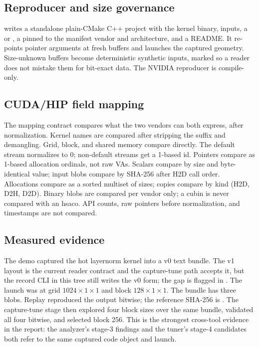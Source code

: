 \subsection{Reproducer and size governance}
\label{sec:c4-repro}

 writes a standalone plain-CMake C++ project with the kernel
binary, inputs, a  or , a 
pinned to the manifest vendor and architecture, and a README. It re-points
pointer arguments at fresh buffers and launches the captured geometry.
Size-unknown buffers become deterministic synthetic inputs, marked so a reader
does not mistake them for bit-exact data. The NVIDIA reproducer is
compile-only.

\subsection{CUDA/HIP field mapping}
\label{sec:c4-mapping}

The mapping contract compares what the two vendors can both express, after
normalization. Kernel names are compared after stripping the  suffix
and demangling. Grid, block, and shared memory compare directly. The default
stream normalizes to 0; non-default streams get a 1-based id. Pointers compare
as 1-based allocation ordinals, not raw VAs. Scalars compare by size and
byte-identical value; input blobs compare by SHA-256 after H2D call order.
Allocations compare as a sorted multiset of sizes; copies compare by kind
(H2D, D2H, D2D). Binary blobs are compared per vendor only; a cubin is never
compared with an hsaco. API counts, raw pointers before normalization, and
timestamps are not compared.

\subsection{Measured evidence}
\label{sec:c4-evidence}

The demo captured the hot layernorm kernel
\allowbreak{} into a v0
text bundle. The v1 layout is the current reader contract and the
capture-tune path accepts it, but the record CLI in this tree still writes
the v0 form; the gap is flagged in . The launch
was at grid
$1024 \times 1 \times 1$ and block $128 \times 1 \times 1$. The bundle has
three blobs. Replay reproduced the output bitwise; the reference SHA-256 is
\allowbreak{}.
The capture-tune stage then explored four block sizes over the same bundle,
validated all four bitwise, and selected block 256. This is the strongest
cross-tool evidence in the report: the analyzer's stage-3 findings and the
tuner's stage-4 candidates both refer to the same captured code object and
launch.

